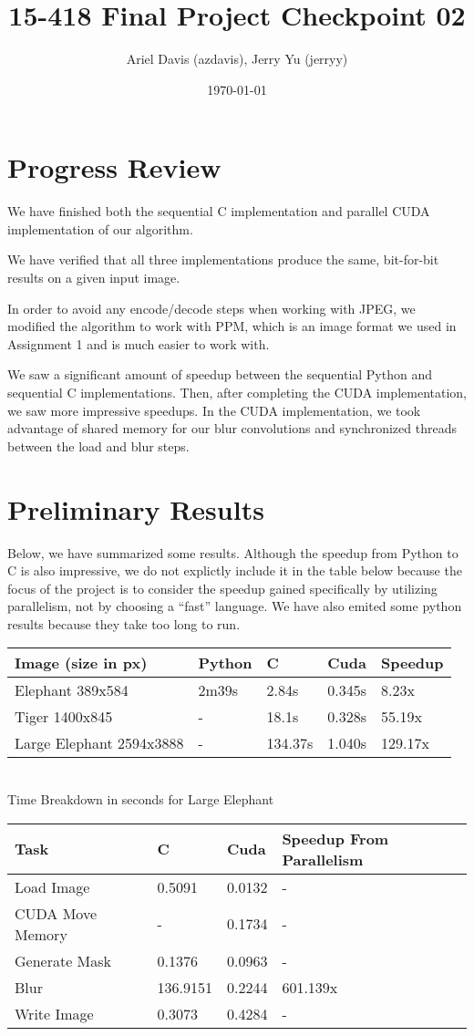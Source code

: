 \documentclass[12pt]{article}
\author{Ariel Davis (azdavis), Jerry Yu (jerryy)}
\date{\today}
\title{15-418 Final Project Checkpoint 02}
\begin{document}
\maketitle

\section{Progress Review}

We have finished both the sequential C implementation and parallel CUDA
implementation of our algorithm.

We have verified that all three implementations produce the same, bit-for-bit
results on a given input image.

In order to avoid any encode/decode steps when working with JPEG, we modified
the algorithm to work with PPM, which is an image format we used in Assignment
1 and is much easier to work with.

We saw a significant amount of speedup between the sequential Python and
sequential C implementations. Then, after completing the CUDA implementation,
we saw more impressive speedups. In the CUDA implementation, we took advantage
of shared memory for our blur convolutions and synchronized threads between
the load and blur steps.

\section{Preliminary Results}

Below, we have summarized some results. Although the speedup from Python to C
is also impressive, we do not explictly include it in the table below because
the focus of the project is to consider the speedup gained specifically by
utilizing parallelism, not by choosing a ``fast'' language. We have also emited
some python results because they take too long to run.

\begin{tabular}{l|l|l|l|l}
    Image (size in px) & Python & C & Cuda & Speedup \\
    \hline
    Elephant 389x584 & 2m39s & 2.84s & 0.345s & 8.23x \\
    Tiger 1400x845 & - & 18.1s & 0.328s & 55.19x \\
    Large Elephant 2594x3888 & - & 134.37s & 1.040s & 129.17x \\
\end{tabular}
\\
Time Breakdown in seconds for Large Elephant \\
\begin{tabular}{l|l|l|l}
    Task & C & Cuda & Speedup From Parallelism\\
    \hline
    Load Image & 0.5091 & 0.0132 & - \\
    CUDA Move Memory & - & 0.1734 & - \\
    Generate Mask & 0.1376 & 0.0963 & - \\
    Blur & 136.9151 & 0.2244 & 601.139x \\
    Write Image & 0.3073 & 0.4284 & -
\end{tabular}
\end{document}
